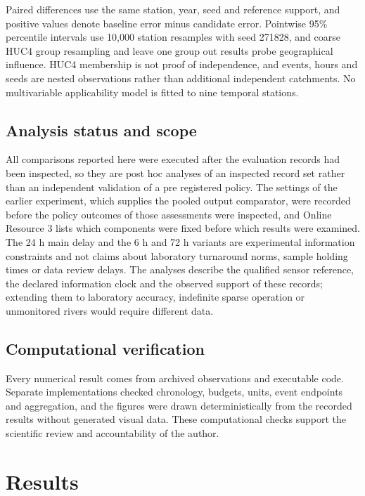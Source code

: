 \documentclass[pdflatex,sn-mathphys-num]{sn-jnl}%
\theoremstyle{thmstyleone}%
\theoremstyle{thmstyletwo}%
\theoremstyle{thmstylethree}%
\begin{document}
Paired differences use the same station, year, seed and reference support, and positive values denote baseline error minus candidate error. Pointwise 95\% percentile intervals use 10,000 station resamples with seed 271828, and coarse HUC4 group resampling and leave one group out results probe geographical influence. HUC4 membership is not proof of independence, and events, hours and seeds are nested observations rather than additional independent catchments. No multivariable applicability model is fitted to nine temporal stations.

\subsection{Analysis status and scope}

All comparisons reported here were executed after the evaluation records had been inspected, so they are post hoc analyses of an inspected record set rather than an independent validation of a pre registered policy. The settings of the earlier experiment, which supplies the pooled output comparator, were recorded before the policy outcomes of those assessments were inspected, and Online Resource 3 lists which components were fixed before which results were examined. The 24 h main delay and the 6 h and 72 h variants are experimental information constraints and not claims about laboratory turnaround norms, sample holding times or data review delays. The analyses describe the qualified sensor reference, the declared information clock and the observed support of these records; extending them to laboratory accuracy, indefinite sparse operation or unmonitored rivers would require different data.

\subsection{Computational verification}

Every numerical result comes from archived observations and executable code. Separate implementations checked chronology, budgets, units, event endpoints and aggregation, and the figures were drawn deterministically from the recorded results without generated visual data. These computational checks support the scientific review and accountability of the author.

\section{Results}\label{sec:results}
\end{document}
